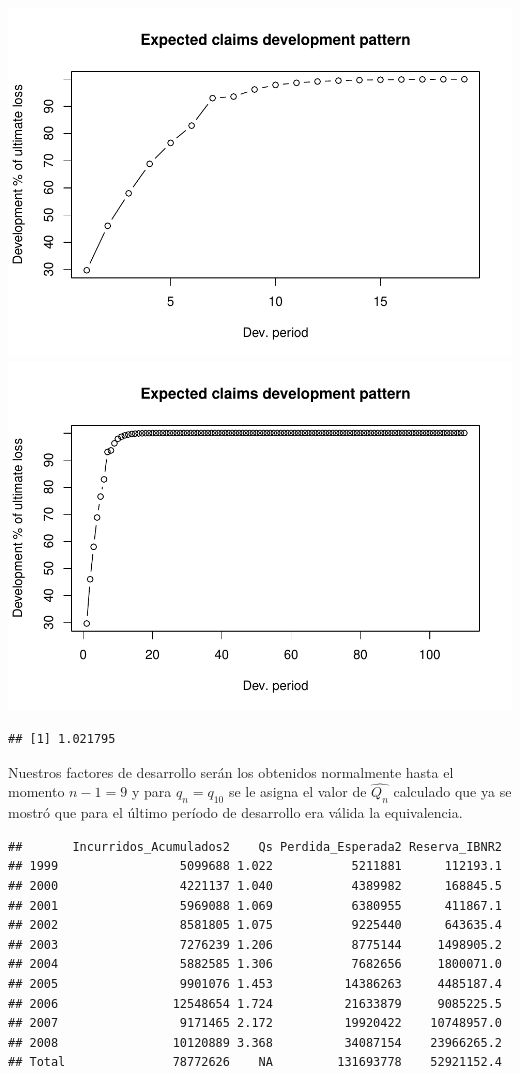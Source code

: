 \documentclass[
  12pt,
]{article}
\begin{document}
\includegraphics{informe_files/figure-latex/unnamed-chunk-8-1.pdf}
\includegraphics{informe_files/figure-latex/unnamed-chunk-8-2.pdf}

\begin{verbatim}
## [1] 1.021795
\end{verbatim}

Nuestros factores de desarrollo serán los obtenidos normalmente hasta el
momento \(n-1=9\) y para \(q_n=q_{10}\) se le asigna el valor de
\(\hat{Q_n}\) calculado que ya se mostró que para el último período de
desarrollo era válida la equivalencia.

\begin{verbatim}
##       Incurridos_Acumulados2    Qs Perdida_Esperada2 Reserva_IBNR2
## 1999                 5099688 1.022           5211881      112193.1
## 2000                 4221137 1.040           4389982      168845.5
## 2001                 5969088 1.069           6380955      411867.1
## 2002                 8581805 1.075           9225440      643635.4
## 2003                 7276239 1.206           8775144     1498905.2
## 2004                 5882585 1.306           7682656     1800071.0
## 2005                 9901076 1.453          14386263     4485187.4
## 2006                12548654 1.724          21633879     9085225.5
## 2007                 9171465 2.172          19920422    10748957.0
## 2008                10120889 3.368          34087154    23966265.2
## Total               78772626    NA         131693778    52921152.4
\end{verbatim}
\end{document}
